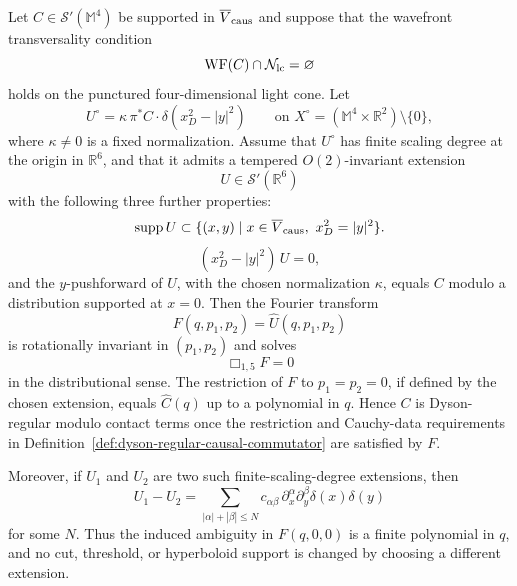\begin{theorem}
\label{thm:punctured-dyson-lift-finite-scaling-degree}
Let \(C\in\mathcal S'(\mathbb M^4)\) be supported in
\(\overline V_{\rm caus}\) and suppose that the wavefront transversality
condition
\[
  \operatorname{WF}(C)\cap\mathcal N_{\rm lc}=\varnothing
\]
holds on the punctured four-dimensional light cone.  Let
\begin{equation}
  U^\circ=\kappa\,\pi^*C\cdot\delta(x_D^2-|y|^2)
  \qquad
  \text{on }
  X^\circ=(\mathbb M^4\times\mathbb R^2)\setminus\{0\},
  \label{eq:punctured-dyson-lift-Ucirc}
\end{equation}
where \(\kappa\ne0\) is a fixed normalization.  Assume that
\(U^\circ\) has finite scaling degree at the origin in
\(\mathbb R^6\), and that it admits a tempered \(O(2)\)-invariant extension
\[
  U\in\mathcal S'(\mathbb R^6)
\]
with the following three further properties:
\begin{equation}
  \operatorname{supp}U
  \subset
  \{(x,y)\mid x\in\overline V_{\rm caus},\ x_D^2=|y|^2\}.
  \label{eq:dyson-extension-support}
\end{equation}
\begin{equation}
  (x_D^2-|y|^2)\,U=0,
  \label{eq:dyson-extension-cone-equation}
\end{equation}
and the \(y\)-pushforward of \(U\), with the chosen normalization \(\kappa\),
equals \(C\) modulo a distribution supported at \(x=0\).
Then the Fourier transform
\[
  F(q,p_1,p_2)=\widehat U(q,p_1,p_2)
\]
is rotationally invariant in \((p_1,p_2)\) and solves
\begin{equation}
  \Box_{1,5}F=0
  \label{eq:dyson-extension-wave-equation}
\end{equation}
in the distributional sense.  The restriction of \(F\) to \(p_1=p_2=0\), if
defined by the chosen extension, equals \(\widehat C(q)\) up to a polynomial
in \(q\).  Hence \(C\) is Dyson-regular modulo contact terms once the
restriction and Cauchy-data requirements in
Definition~\ref{def:dyson-regular-causal-commutator} are satisfied by \(F\).

Moreover, if \(U_1\) and \(U_2\) are two such finite-scaling-degree
extensions, then
\begin{equation}
  U_1-U_2
  =
  \sum_{|\alpha|+|\beta|\le N}
  c_{\alpha\beta}\,
  \partial_x^\alpha\partial_y^\beta\delta(x)\delta(y)
  \label{eq:dyson-extension-local-ambiguity}
\end{equation}
for some \(N\).  Thus the induced ambiguity in \(F(q,0,0)\) is a finite
polynomial in \(q\), and no cut, threshold, or hyperboloid support is changed
by choosing a different extension.
\end{theorem}

